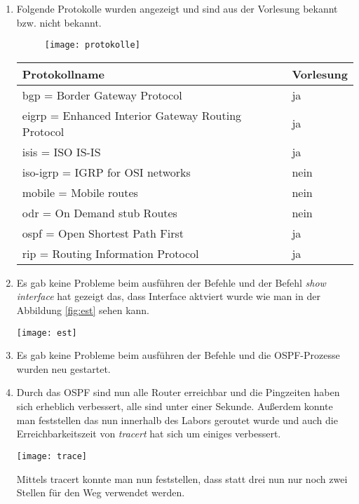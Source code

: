 \documentclass{scrartcl}
\begin{document}
    \renewcommand{\labelenumi}{\alph{enumi})}
    \begin{enumerate} 
    \item 
	Folgende Protokolle wurden angezeigt und sind aus der Vorlesung bekannt bzw. nicht bekannt.   
   \begin{figure}[htbp]
   \centering
   \texttt{[image: protokolle]}
   \label{fig:protokolle}
   \end{figure}
    
     \begin{table}[htbp]
   \centering
  \begin{tabular}{|l|l}
      \textbf{Protokollname} & \textbf{Vorlesung} \\ \hline
		 bgp = Border Gateway Protocol  & ja \\
		 eigrp = Enhanced Interior Gateway Routing Protocol  & ja \\
		 isis = ISO IS-IS & ja\\
		 iso-igrp = IGRP for OSI networks & nein \\
		 mobile = Mobile routes & nein\\
		 odr = On Demand stub Routes & nein \\
		 ospf = Open Shortest Path First & ja\\
		 rip = Routing Information Protocol & ja
    \end{tabular}
   \end{table}
        
    \item
    Es gab keine Probleme beim ausführen der Befehle und der Befehl \textit{show interface} hat gezeigt das, dass Interface aktviert wurde wie man in der Abbildung \ref{fig:est} sehen kann.
    
   \texttt{[image: est]}
   \label{fig:est}

    
    \item
    Es gab keine Probleme beim ausführen der Befehle und die OSPF-Prozesse wurden neu gestartet.
    
    \item
    Durch das OSPF sind nun alle Router erreichbar und die Pingzeiten haben sich erheblich verbessert, alle sind unter einer Sekunde. Außerdem konnte man feststellen das nun innerhalb des Labors geroutet wurde und auch die Erreichbarkeitszeit von \textit{tracert} hat sich um einiges verbessert.
	
   \texttt{[image: trace]}
   \label{fig:trace}
   
   Mittels tracert konnte man nun feststellen, dass statt drei nun nur noch zwei Stellen für den Weg verwendet werden.
   

\end{enumerate}
\end{document}
